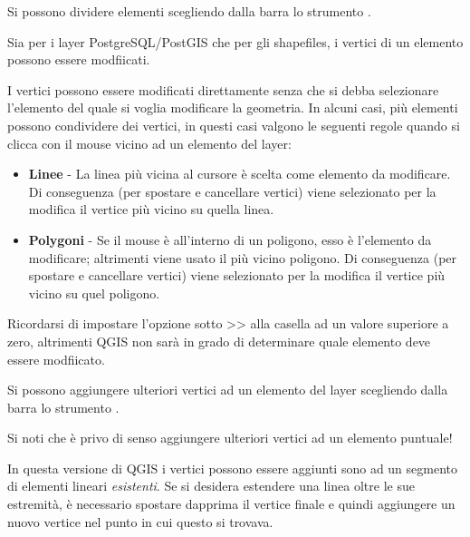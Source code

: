 Si possono dividere elementi scegliendo dalla barra lo strumento .


Sia per i layer PostgreSQL/PostGIS che per gli shapefiles, i vertici di un
elemento possono essere modfiicati. 

I vertici possono essere modificati direttamente senza che si debba
selezionare l'elemento del quale si voglia modificare la geometria.
In alcuni casi, più elementi possono condividere dei vertici, in questi casi
valgono le seguenti regole quando si clicca con il mouse vicino ad un elemento
del layer:

\begin{itemize}
\item \textbf{Linee}    - La linea più vicina al cursore è scelta come
                          elemento da modificare.
                          Di conseguenza (per spostare e cancellare vertici)
                          viene selezionato per la modifica il vertice
                          più vicino su quella linea.

\item \textbf{Polygoni} - Se il mouse è all'interno di un poligono, esso è
                          l'elemento da modificare; altrimenti viene usato il più vicino
			  poligono.
                          Di conseguenza (per spostare e cancellare vertici)
                          viene selezionato per la modifica il vertice più
			  vicino su quel poligono.
\end{itemize}

Ricordarsi di impostare l'opzione sotto
>>
alla casella 
ad un valore superiore a zero, altrimenti QGIS non sarà in grado di
determinare quale elemento deve essere modfiicato.



Si possono aggiungere ulteriori vertici ad un elemento del layer scegliendo
dalla barra lo strumento .

Si noti che è privo di senso aggiungere ulteriori vertici ad un elemento
puntuale!

In questa versione di QGIS i vertici possono essere aggiunti sono ad un
segmento di elementi lineari \textit{esistenti}. Se si desidera estendere una
linea oltre le sue estremità, è necessario spostare dapprima il vertice finale
e quindi aggiungere un nuovo vertice nel punto in cui questo si trovava.


